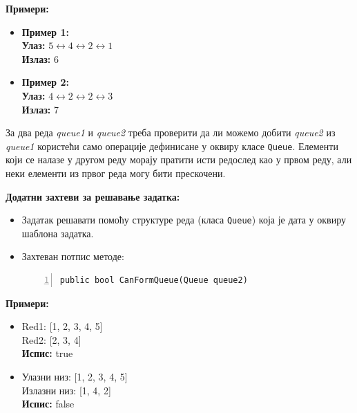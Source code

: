 \textbf{Примери:}
\begin{itemize}
    \item \textbf{Пример 1:} \\
          \textbf{Улаз:} $5 \leftrightarrow 4 \leftrightarrow 2 \leftrightarrow 1$ \\
          \textbf{Излаз:} 6
    \item \textbf{Пример 2:} \\
          \textbf{Улаз:} $4 \leftrightarrow 2 \leftrightarrow 2 \leftrightarrow 3$ \\
          \textbf{Излаз:} 7
\end{itemize}



За два реда \textit{queue1} и \textit{queue2} треба проверити да ли можемо добити \textit{queue2} из \textit{queue1} користећи само операције дефинисане у оквиру класе \texttt{Queue}. Елементи који се налазе у другом реду морају пратити исти редослед као у првом реду, али неки елементи из првог реда могу бити прескочени.

\textbf{Додатни захтеви за решавање задатка:}
\begin{itemize}
    \item Задатак решавати помоћу структуре реда (класа \texttt{Queue}) која је дата у оквиру шаблона задатка.
    \item Захтеван потпис методе:
    \begin{Verbatim}[fontsize=\footnotesize, numbers=left, xleftmargin=10mm]
public bool CanFormQueue(Queue queue2)
    \end{Verbatim}
\end{itemize}

\textbf{Примери:}
\begin{itemize}
    \item Red1: [1, 2, 3, 4, 5] \\
          Red2: [2, 3, 4] \\
          \textbf{Испис:} true
    \item Улазни низ: [1, 2, 3, 4, 5] \\
          Излазни низ: [1, 4, 2] \\
          \textbf{Испис:} false
\end{itemize}

